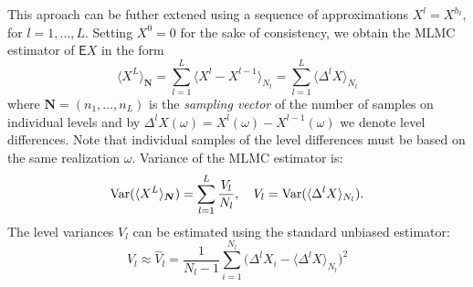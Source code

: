 \documentclass{article}
\def\vc#1{\mathbf{\boldsymbol{#1}}}     %
\def \E{{\mathsf E}}
\def\avg#1{\langle#1\rangle}
\def\Var{\mathop{\rm Var}}
\begin{document}
This aproach can be futher extened using a sequence of approximations $X^l = X^{h_l}$, for $l=1,\dots, L$.
Setting $X^0 = 0$ for the sake of consistency,
we obtain the MLMC estimator of $\E X$ in the form
\begin{equation}
    \label{eq:mlmc_est}
	\avg{X^L}_{\vc N} = \sum_{l=1}^L \avg{X^l - X^{l-1}}_{N_l} = \sum_{l=1}^L \avg{\Delta^l X}_{N_l}
\end{equation}
where $\vc N=(n_1,\dots, n_L)$ is the \emph{sampling vector} of the number of samples on individual levels 
and by $\Delta^l X(\omega) = X^l(\omega) - X^{l-1}(\omega)$ we denote level differences. Note that 
individual samples of the level differences must be based on the same realization $\omega$. 
Variance of the MLMC estimator is:
\begin{equation}
    \label{eq:var_mlmc}
    \Var( \avg{X^L}_{\vc N}) = \sum_{l=1}^L \frac{V_l}{N_l},\quad V_l = \Var(\avg{\Delta^l X}_{N_l}).
\end{equation}
The level variances $V_l$ can be estimated using the standard unbiased estimator:
\[
  V_l \approx \widehat{V}_l  = \frac{1}{N_l-1} \sum_{i=1}^{N_l} \big(\Delta^l X_i - \avg{\Delta^l X}_{N_l}\big)^2
\]
\end{document}
